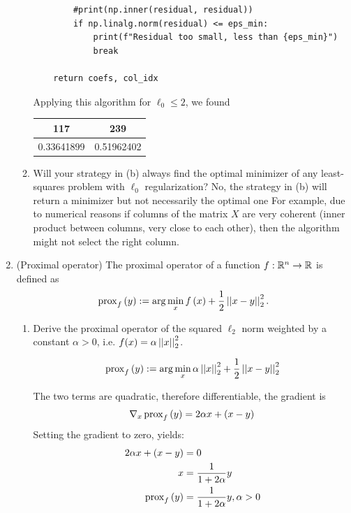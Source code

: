 \documentclass[12pt,twoside]{article}
\begin{document}
\begin{enumerate}
\begin{enumerate}
\begin{verbatim}
        #print(np.inner(residual, residual))
        if np.linalg.norm(residual) <= eps_min:
            print(f"Residual too small, less than {eps_min}")
            break
            
    return coefs, col_idx
\end{verbatim}
Applying this algorithm for  $\ell_0 \leq 2$, we found
    \begin{center}
    		\begin{tabular}{ | c | c |  }
    		\hline
			\text{column} 117 & \text{column} 239 \\
		\hline
			0.33641899 & 0.51962402 \\ 
		\hline
    	\end{tabular}
    \end{center}

    \item Will your strategy in (b) always find the optimal minimizer of any least-squares problem with $\ell_0$ regularization?
    No, the strategy in (b) will return a minimizer but not necessarily the optimal one For example, due to numerical reasons if columns of the matrix $X$ are very coherent (inner product  between columns, very close to each other), then the algorithm might not select the right column.     
  \end{enumerate}
  
 \newpage
 \item (Proximal operator) The proximal operator of a function $f: \mathbb{R}^n \rightarrow \mathbb{R}$ is defined as
\begin{align}
\operatorname{prox}_{f}\left( y \right) := \arg \min_{x} f\left( x \right)+ \frac{1}{2} \left|\left| x-y \right|\right| _{2}^2.
\end{align}
  \begin{enumerate}
  \item Derive the proximal operator of the squared $\ell_2$ norm weighted by a constant $\alpha > 0$, i.e. $f(x)=\alpha \left|\left| x \right|\right| _{2}^2$.

\begin{align*}
\operatorname{prox}_{f}\left( y \right) := \arg \min_{x}  \alpha \left|\left| x \right|\right| _{2}^2 + \frac{1}{2} \left|\left| x-y \right|\right| _{2}^2
\end{align*}

The two terms are quadratic, therefore differentiable, the gradient is 
$$
	\nabla_x \operatorname{prox}_{f}\left( y \right) = 2 \alpha x + (x-y)
$$
 Setting the gradient to zero, yields:
\begin{align*}
	2 \alpha x + (x-y)			&= 	0 \\
		x 					&= \frac{1} {1+2 \alpha} y \\
		\operatorname{prox}_{f}\left( y \right) 		&=	 \frac{1} {1+2 \alpha} y, \alpha > 0 \\
\end{align*}
 

\end{enumerate}
\end{enumerate}
\end{document}
